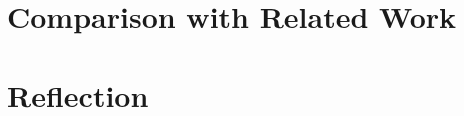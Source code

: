 \section{Comparison with Related Work}
\label{sec:ComparisonRelatedWork}

\section{Reflection}
\label{sec:Reflection}

